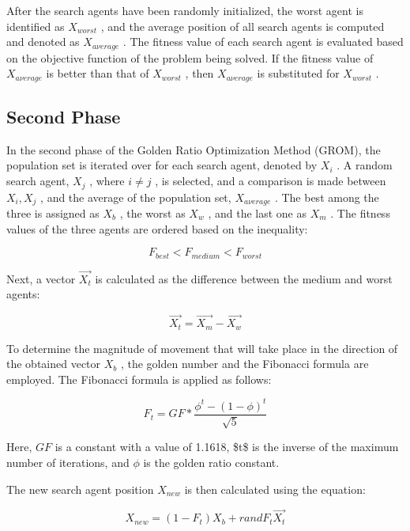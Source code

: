 After the search agents have been randomly initialized, the worst agent is identified as $X_{w o r s t}$ , and the average position of all search agents is computed and denoted as $X_{a\nu e r a g e}$ . The fitness value of each search agent is evaluated based on the objective function of the problem being solved. If the fitness value of $X_{a\nu e r a g e}$ is better than that of $X_{w o r s t}$ , then $X_{a\nu e r a g e}$ is substituted for $X_{w o r s t}$ .

\subsection{Second Phase}

In the second phase of the Golden Ratio Optimization Method (GROM), the population set is iterated over for each search agent, denoted by $X_{i}$ . A random search agent, $X_{j}$ , where $i\neq j$ , is selected, and a comparison is made between $X_{i},X_{j}$ , and the average of the population set, $X_{a\nu e r a g e}$ . The best among the three is assigned as $X_{b}$ , the worst as $X_{w}$ , and the last one as $X_{m}$ . The fitness values of the three agents are ordered based on the inequality:

\begin{equation}
F_{b e s t}<F_{m e d i u m}<F_{w o r s t}
\end{equation}

Next, a vector $\vec{X_{t}}$ is calculated as the difference between the medium and worst agents:

\begin{equation}
\vec{X_{t}}=\vec{X_{m}}-\vec{X_{w}}
\end{equation}

To determine the magnitude of movement that will take place in the direction of the obtained vector $X_{b}$ , the golden number and the Fibonacci formula are employed. The Fibonacci formula is applied as follows:

\begin{equation}
F_{t}=G F*\frac{\phi^{t}-(1-\phi)^{t}}{\sqrt{5}}
\end{equation}

Here, $G F$ is a constant with a value of 1.1618, \$t\$ is the inverse of the maximum number of iterations, and $\phi$ is the golden ratio constant.

The new search agent position $X_{n e w}$ is then calculated using the equation:

\begin{equation}
X_{n e w}=(1-F_{t})X_{b}+r a n d F_{t}\vec{X_{t}}
\end{equation}

